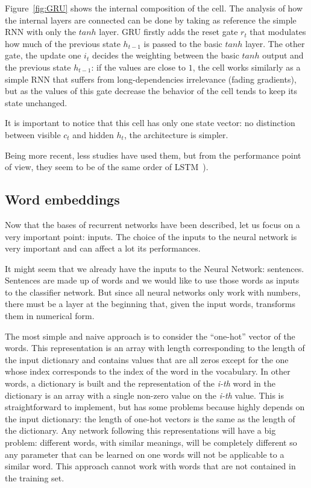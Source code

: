 Figure~\ref{fig:GRU} shows the internal composition of the cell. The analysis of how the internal layers are connected can be done by taking as reference the simple RNN with only the $tanh$ layer. GRU firstly adds the reset gate $r_{t}$ that modulates how much of the previous state $h_{t-1}$ is passed to the basic $tanh$ layer. The other gate, the update one $i_{t}$ decides the weighting between the basic $tanh$ output and the previous state $h_{t-1}$: if the values are close to $1$, the cell works similarly as a simple RNN that suffers from long-dependencies irrelevance (fading gradients), but as the values of this gate decrease the behavior of the cell tends to keep its state unchanged.

It is important to notice that this cell has only one state vector: no distinction between visible $c_{t}$ and hidden $h_{t}$, the architecture is simpler.

Being more recent, less studies have used them, but from the performance point of view, they seem to be of the same order of LSTM~\cite{jozefowicz2015empirical,chung2014empirical}).

\subsection{Word embeddings}
\label{soaWordEmbeddings}

Now that the bases of recurrent networks have been described, let us focus on a very important point: inputs. The choice of the inputs to the neural network is very important and can affect a lot its performances.

It might seem that we already have the inputs to the Neural Network: sentences. Sentences are made up of words and we would like to use those words as inputs to the classifier network.
But since all neural networks only work with numbers, there must be a layer at the beginning that, given the input words, transforms them in numerical form.

The most simple and naive approach is to consider the ``one-hot'' vector of the words. This representation is an array with length corresponding to the length of the input dictionary and contains values that are all zeros except for the one whose index corresponds to the index of the word in the vocabulary. In other words, a dictionary is built and the representation of the \textit{i-th} word in the dictionary is an array with a single non-zero value on the \textit{i-th} value. This is straightforward to implement, but has some problems because highly depends on the input dictionary: the length of one-hot vectors is the same as the length of the dictionary. Any network following this representations will have a big problem: different words, with similar meanings, will be completely different so any parameter that can be learned on one words will not be applicable to a similar word. This approach cannot work with words that are not contained in the training set.

